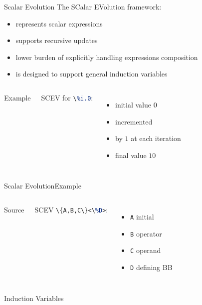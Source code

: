 \documentclass[10pt,mathserif]{beamer}
\newcommand{\cinput}[1]{}
\newcommand{\llvminput}[1]{}
\newcommand{\llvminline}[1]{\lstinline[language=LLVM]!#1!}
\begin{document}
\begin{frame}{Scalar Evolution}
The \alert{SC}alar \alert{EV}olution framework:

\begin{itemize}
\item represents scalar expressions
\item supports recursive updates
\item lower burden of explicitly handling expressions composition
\item is designed to support \alert{general induction variables}
\end{itemize}

\vfill
\begin{columns}
\begin{block}{Example}
\centering
\llvminput{snippet/02/basic-scev.ll}
\end{block}

SCEV for \llvminline{\%i.0}:

\begin{itemize}
\item initial value $0$
\item incremented
\item by $1$ at each iteration
\item final value $10$
\end{itemize}
\end{columns}
\end{frame}

\begin{frame}{Scalar Evolution}{Example}
\begin{columns}
\begin{block}{Source}
\centering
\cinput{snippet/02/nested-scev.c}
\end{block}

SCEV \llvminline{\{A,B,C\}<\%D>}:

\begin{itemize}
\item \llvminline{A} initial
\item \llvminline{B} operator
\item \llvminline{C} operand
\item \llvminline{D} defining BB
\end{itemize}
\end{columns}

\vfill
\begin{block}{Induction Variables}
\centering
\llvminput{snippet/02/nested-scev-induction.ll}
\end{block}
\end{frame}
\end{document}
